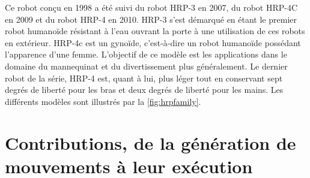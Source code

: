 Ce robot conçu en 1998 a été suivi du robot HRP-3 en 2007, du robot
HRP-4C en 2009 et du robot HRP-4 en 2010. HRP-3 s'est démarqué en
étant le premier robot humanoïde résistant à l'eau ouvrant la porte à
une utilisation de ces robots en extérieur. HRP-4c est un gynoïde,
c'est-à-dire un robot humanoïde possédant l'apparence d'une
femme. L'objectif de ce modèle est les applications dans le domaine du
mannequinat et du divertissement plus généralement. Le dernier robot
de la série, HRP-4 est, quant à lui, plus léger tout en conservant
sept degrés de liberté pour les bras et deux degrés de liberté pour
les mains. Les différents modèles sont illustrés par la
\autoref{fig:hrpfamily}.


\section[Contributions]{Contributions, de la génération de mouvements à leur exécution}


